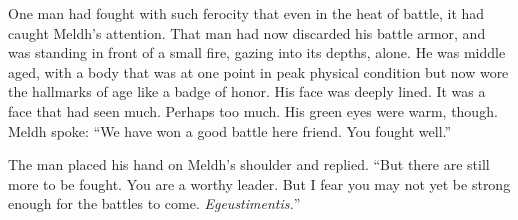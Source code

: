 One man had fought with such ferocity that even in the heat of battle, it had caught Meldh’s attention. That man had now discarded his battle armor, and was standing in front of a small fire, gazing into its depths, alone. He was middle aged, with a body that was at one point in peak physical condition but now wore the hallmarks of age like a badge of honor. His face was deeply lined. It was a face that had seen much. Perhaps too much. His green eyes were warm, though. Meldh spoke: “We have won a good battle here friend. You fought well.”

The man placed his hand on Meldh’s shoulder and replied. “But there are still more to be fought. You are a worthy leader. But I fear you may not yet be strong enough for the battles to come. \emph{Egeustimentis.}”

 

